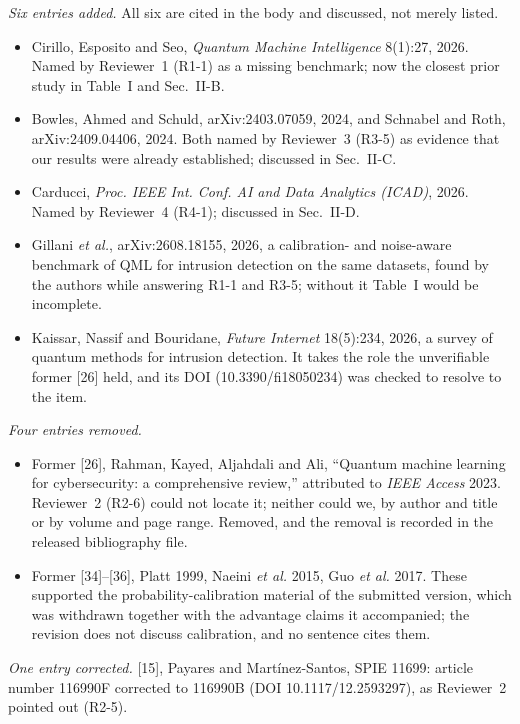 \documentclass[11pt,a4paper]{article}
\begin{document}
\emph{Six entries added.} All six are cited in the body and discussed, not
merely listed.
\begin{itemize}[leftmargin=1.3em,itemsep=2pt,topsep=3pt]
  \item Cirillo, Esposito and Seo, \emph{Quantum Machine Intelligence} 8(1):27,
    2026. Named by Reviewer~1 (R1-1) as a missing benchmark; now the closest
    prior study in Table~I and Sec.~II-B.
  \item Bowles, Ahmed and Schuld, arXiv:2403.07059, 2024, and Schnabel and
    Roth, arXiv:2409.04406, 2024. Both named by Reviewer~3 (R3-5) as evidence
    that our results were already established; discussed in Sec.~II-C.
  \item Carducci, \emph{Proc. IEEE Int. Conf. AI and Data Analytics (ICAD)},
    2026. Named by Reviewer~4 (R4-1); discussed in Sec.~II-D.
  \item Gillani \emph{et al.}, arXiv:2608.18155, 2026, a calibration- and
    noise-aware benchmark of QML for intrusion detection on the same datasets,
    found by the authors while answering R1-1 and R3-5; without it Table~I
    would be incomplete.
  \item Kaissar, Nassif and Bouridane, \emph{Future Internet} 18(5):234, 2026,
    a survey of quantum methods for intrusion detection. It takes the role the
    unverifiable former [26] held, and its DOI (10.3390/fi18050234) was checked
    to resolve to the item.
\end{itemize}

\emph{Four entries removed.}
\begin{itemize}[leftmargin=1.3em,itemsep=2pt,topsep=3pt]
  \item Former [26], Rahman, Kayed, Aljahdali and Ali, ``Quantum machine
    learning for cybersecurity: a comprehensive review,'' attributed to
    \emph{IEEE Access} 2023. Reviewer~2 (R2-6) could not locate it; neither
    could we, by author and title or by volume and page range. Removed, and the
    removal is recorded in the released bibliography file.
  \item Former [34]--[36], Platt 1999, Naeini \emph{et al.} 2015, Guo
    \emph{et al.} 2017. These supported the probability-calibration material
    of the submitted version, which was withdrawn together with the advantage
    claims it accompanied; the revision does not discuss calibration, and no
    sentence cites them.
\end{itemize}

\emph{One entry corrected.} [15], Payares and Mart\'inez-Santos, SPIE 11699:
article number 116990F corrected to 116990B (DOI 10.1117/12.2593297), as
Reviewer~2 pointed out (R2-5).
\end{document}
